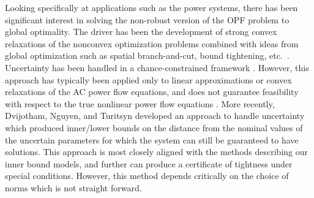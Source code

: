 Looking specifically at applications such as the power systems, there has been significant interest in solving the non-robust version of the OPF problem to global optimality.
The driver has been the development of strong convex relaxations of the nonconvex optimization problems combined with ideas from global optimization such as spatial branch-and-cut, bound tightening, etc.~\cite{BiMu2016,coffrin2015strengthening}.
Uncertainty has been handled in a chance-constrained framework \cite{BiChHa2014,zhang2011chance}.
However, this approach has typically been applied only to linear approximations or convex relaxations of the AC power flow equations, and does not guarantee feasibility with respect to the true nonlinear power flow equations \cite{BiChHa2014,kocuk2016strong,RoVrOlAn2015,TsBiTa2016}.
More recently, Dvijotham, Nguyen, and Turitsyn \cite{DjTuritsyn} developed an approach to handle uncertainty which produced inner/lower bounds on the distance from the nominal values of the uncertain parameters for which the system can still be guaranteed to have solutions.
This approach is most closely aligned with the methods describing our inner bound models, and further can produce a certificate of tightness under special conditions. 
However, this method depends critically on the choice of norms which is not  straight forward.



